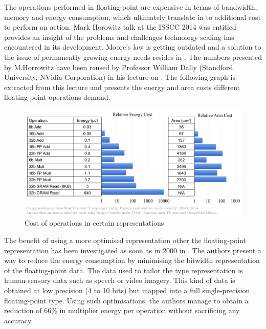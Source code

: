 The operations performed in floating-point are expensive in terms of bandwidth, memory and energy consumption, which ultimately translate in to additional cost to perform an action. Mark Horowitz talk at the ISSCC 2014 was entitled  provides an insight of the problems and challenges technology scaling has encountered in its development. Moore's law is getting outdated and a solution to the issue of permanently growing energy needs resides in . The numbers presented by M.Horrowitz have been reused by Professor William Dally (Standford University, NVidia Corporation) in his lecture on  \cite{Nips2015}. The following graph is extracted from this lecture and presents the energy and area costs different floating-point operations demand.

\begin{figure}[htbp]
	\centering
		\includegraphics[width=15cm]{Figures/OpCosts.png}
	\caption[Operation costs]{Cost of operations in certain representations \cite{Nips2015,Horowitz2014}}
	\label{fig:OpCosts}
\end{figure}

The benefit of using a more optimised representation other the floating-point representation has been investigated as soon as in 2000 in \cite{Tong2000}. The authors present a way to reduce the energy consumption by minimising the bitwidth representation of the floating-point data. The data used to tailor the type representation is human-sensory data such as speech or video imagery. This kind of data is obtained at low precision (4 to 10 bits) but mapped into a full single-precision floating-point type. Using such optimisations, the authors manage to obtain a reduction of 66\% in multiplier energy per operation without sacrificing any accuracy.

